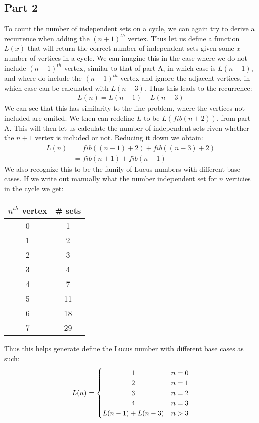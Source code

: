 \documentclass[11pt]{article}
\begin{document}
\subsection*{Part 2}
To count the number of independent sets on a cycle, we can again try to derive a recurrence when adding the $(n+1)^{th}$ vertex. Thus let us define a function $L(x)$ that will return the correct number of independent sets given some $x$ number of vertices in a cycle. We can imagine this in the case where we do not include $(n+1)^{th}$ vertex, similar to that of part A, in which case is $L(n-1)$, and where do include the $(n+1)^{th}$ vertex and ignore the adjacent vertices, in which case can be calculated with $L(n-3)$. Thus this leads to the recurrence:
\begin{align*}
L(n) = L(n-1) + L(n-3)
\end{align*}
We can see that this has similarity to the line problem, where the vertices not included are omited. We then can redefine $L$ to be $L(fib(n+2))$, from part A. This will then let us calculate the number of independent sets riven whether the $n+1$ vertex is included or not. Reducing it down we obtain:
\begin{align*}
L(n) &= fib((n-1)+2) + fib((n-3)+2)\\
&= fib(n+1) + fib(n-1)
\end{align*} 
We also recognize this to be the family of Lucus numbers with different base cases. If we write out manually what the number independent set for $n$ verticies in the cycle we get:
\begin{center}
\begin{tabular}{c|c}
$n^{th}$ vertex&\# sets\\\hline
0 & 1\\
1 & 2\\
2 & 3\\
3 & 4\\
4 & 7\\
5 & 11\\
6 & 18\\
7 & 29
\end{tabular}
\end{center}
Thus this helps generate define the Lucus number with different base cases as such:
\[
 L(n) =
  \begin{cases} 
      \hfill 1 \hfill & n=0 \\
      \hfill 2 \hfill & n=1\\
      \hfill 3 \hfill & n=2\\
      \hfill 4 \hfill & n=3\\
      \hfill L(n-1) + L(n-3) & n > 3
  \end{cases}
\]
\end{document}
